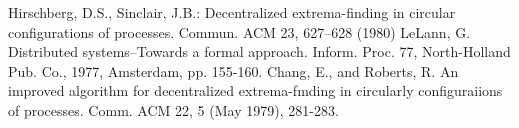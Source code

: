 \documentclass{article}
\begin{document}
\begin{thebibliography}{9}
Hirschberg, D.S., Sinclair, J.B.: Decentralized extrema-finding in circular configurations of processes. Commun. ACM 23, 627–628 (1980)
LeLann, G. Distributed systems--Towards a formal approach. Inform. Proc. 77, North-Holland Pub. Co., 1977, Amsterdam, pp. 155-160.
Chang, E., and Roberts, R. An improved algorithm for decentralized extrema-fmding in circularly configuraiions of processes. Comm. ACM 22, 5 (May 1979), 281-283.
\end{thebibliography}
\end{document}
